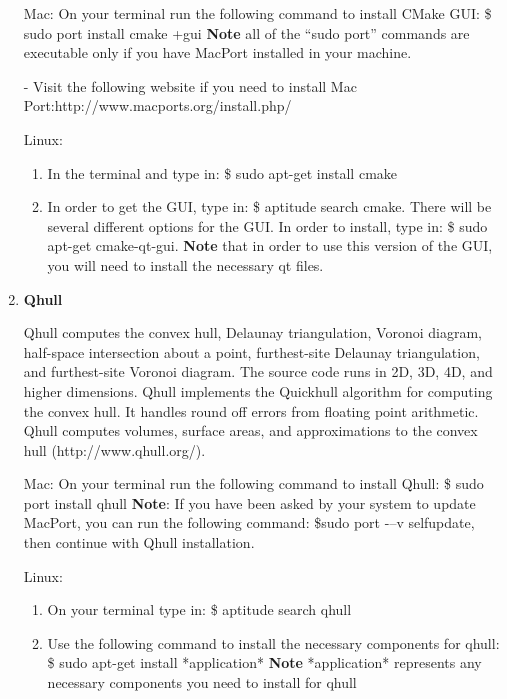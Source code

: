 \documentclass[11pt, letterpaper]{article}
\begin{document}
\begin{enumerate}
Mac: On your terminal run the following command to install CMake GUI: \$ sudo port install cmake +gui
\newline
{\bfseries Note} all of the ``sudo port'' commands are executable only if you have MacPort installed in your machine.

-	Visit the following website if you need to install Mac Port:\newline http://www.macports.org/install.php/

Linux:
\begin{enumerate}
\item In the terminal and type in: \$ sudo apt-get install cmake
\item In order to get the GUI, type in: \$ aptitude search cmake.  There will be several different options for the GUI. In order to install, type in: \$ sudo apt-get cmake-qt-gui. {\bfseries Note} that in order to use this version of the GUI, you will need to install the necessary qt files.
\end{enumerate}

\item {\bfseries Qhull}

Qhull computes the convex hull, Delaunay triangulation, Voronoi diagram, half-space intersection about a point, furthest-site Delaunay triangulation, and furthest-site Voronoi diagram. The source code runs in 2D, 3D, 4D, and higher dimensions. Qhull implements the Quickhull algorithm for computing the convex hull. It handles round off errors from floating point arithmetic. Qhull computes volumes, surface areas, and approximations to the convex hull (http://www.qhull.org/). 

Mac: On your terminal run the following command to install Qhull:\newline
\$ sudo port install qhull
\newline
{\bfseries Note}: If you have been asked by your system to update MacPort, you can run the following command: \$sudo port -–v selfupdate, then continue with Qhull installation.

Linux: 
\begin{enumerate}
\item On your terminal type in: \$ aptitude search qhull
\item Use the following command to install the necessary components for qhull: \$ sudo apt-get install *application*
\newline
{\bfseries Note} *application* represents any necessary components you need to install for qhull
\end{enumerate}
\end{enumerate}
\end{document}
